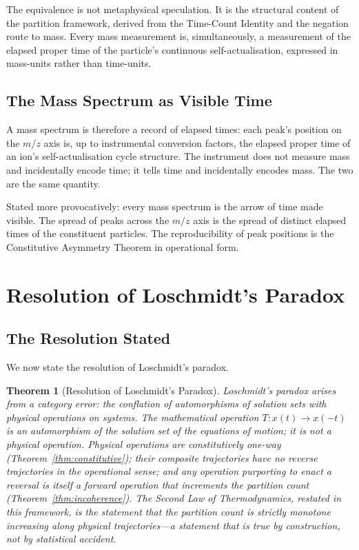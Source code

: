 \documentclass[twocolumn,10pt,a4paper]{article}
\newtheorem{theorem}{Theorem}[section]
\theoremstyle{definition}
\theoremstyle{remark}
\begin{document}
The equivalence is not metaphysical speculation. It is the structural content of the partition framework, derived from the Time-Count Identity and the negation route to mass. Every mass measurement is, simultaneously, a measurement of the elapsed proper time of the particle's continuous self-actualisation, expressed in mass-units rather than time-units.

\subsection{The Mass Spectrum as Visible Time}

A mass spectrum is therefore a record of elapsed times: each peak's position on the $m/z$ axis is, up to instrumental conversion factors, the elapsed proper time of an ion's self-actualisation cycle structure. The instrument does not measure mass and incidentally encode time; it tells time and incidentally encodes mass. The two are the same quantity.

Stated more provocatively: every mass spectrum is the arrow of time made visible. The spread of peaks across the $m/z$ axis is the spread of distinct elapsed times of the constituent particles. The reproducibility of peak positions is the Constitutive Asymmetry Theorem in operational form.

\section{Resolution of Loschmidt's Paradox}
\label{sec:resolution}

\subsection{The Resolution Stated}

We now state the resolution of Loschmidt's paradox.

\begin{theorem}[Resolution of Loschmidt's Paradox]
\label{thm:resolution}
Loschmidt's paradox arises from a category error: the conflation of automorphisms of solution sets with physical operations on systems. The mathematical operation $T: x(t) \to x(-t)$ is an automorphism of the solution set of the equations of motion; it is not a physical operation. Physical operations are constitutively one-way (Theorem~\ref{thm:constitutive}); their composite trajectories have no reverse trajectories in the operational sense; and any operation purporting to enact a reversal is itself a forward operation that increments the partition count (Theorem~\ref{thm:incoherence}). The Second Law of Thermodynamics, restated in this framework, is the statement that the partition count is strictly monotone increasing along physical trajectories---a statement that is true by construction, not by statistical accident.
\end{theorem}
\end{document}
